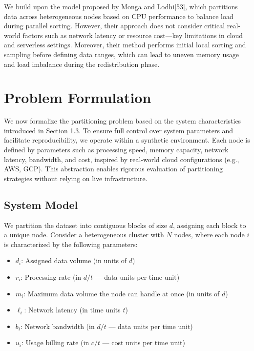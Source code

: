 \documentclass[]{interact}
\theoremstyle{plain}
\theoremstyle{definition}
\theoremstyle{remark}
\begin{document}
We build upon the model proposed by Monga and Lodhi[53], which partitions data across heterogeneous nodes based on CPU performance to balance load during parallel sorting. However, their approach does not consider critical real-world factors such as network latency or resource cost—key limitations in cloud and serverless settings. Moreover, their method performs initial local sorting and sampling before defining data ranges, which can lead to uneven memory usage and load imbalance during the redistribution phase.





\section{Problem Formulation}

We now formalize the partitioning problem based on the system characteristics introduced in Section 1.3. To ensure full control over system parameters and facilitate reproducibility, we operate within a synthetic environment. Each node is defined by parameters such as processing speed, memory capacity, network latency, bandwidth, and cost, inspired by real-world cloud configurations (e.g., AWS, GCP). This abstraction enables rigorous evaluation of partitioning strategies without relying on live infrastructure.

\subsection{System Model}

We partition the dataset into contiguous blocks of size $d$, assigning each block to a unique node. Consider a heterogeneous cluster with $N$ nodes, where each node $i$ is characterized by the following parameters:

\begin{itemize}
    \item $d_i$: Assigned data volume (in units of $d$)
    \item $r_i$: Processing rate (in $d/t$ — data units per time unit)
    \item $m_i$: Maximum data volume the node can handle at once (in units of $d$)
    \item $\ell_i$: Network latency (in time units $t$)
    \item $b_i$: Network bandwidth (in $d/t$ — data units per time unit)
    \item $u_i$: Usage billing rate (in $c/t$ — cost units per time unit)
\end{itemize}
\end{document}
